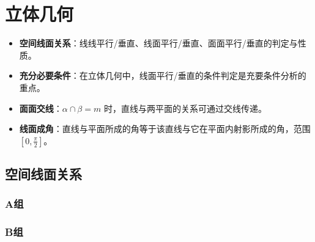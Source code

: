 \chapter{立体几何}

\begin{knowledgeframe}
\begin{itemize}
	\item \textbf{空间线面关系}：线线平行/垂直、线面平行/垂直、面面平行/垂直的判定与性质。
	\item \textbf{充分必要条件}：在立体几何中，线面平行/垂直的条件判定是充要条件分析的重点。
	\item \textbf{面面交线}：$\alpha\cap\beta=m$ 时，直线与两平面的关系可通过交线传递。
	\item \textbf{线面成角}：直线与平面所成的角等于该直线与它在平面内射影所成的角，范围 $[0,\frac{\pi}{2}]$。
\end{itemize}
\end{knowledgeframe}

\section{空间线面关系}

\startexercise

\subsection*{A组}





\subsection*{B组}



\stopexercise
